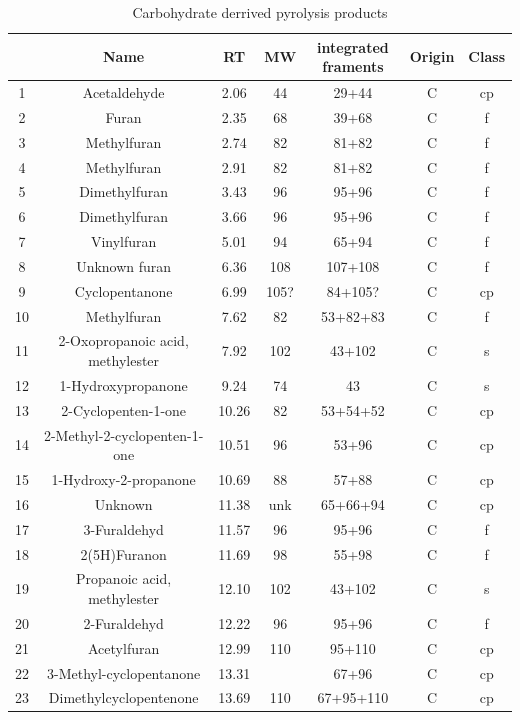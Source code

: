 \documentclass[preprint,review,12pt]{elsarticle}
\begin{document}
\begin{table}[h!]
\begin{center}
\caption{Carbohydrate derrived pyrolysis products}
\label{tab:chprod}
{\tiny
\begin{tabular}{ccccccc}
  \hline
 & Name & RT & MW & integrated framents & Origin & Class \\ 
  \hline
1 & Acetaldehyde & 2.06 & 44 & 29+44 & C & cp \\ 
  2 & Furan & 2.35 & 68 & 39+68 & C & f \\ 
  3 & Methylfuran & 2.74 & 82 & 81+82 & C & f \\ 
  4 & Methylfuran & 2.91 & 82 & 81+82 & C & f \\ 
  5 & Dimethylfuran & 3.43 & 96 & 95+96 & C & f \\ 
  6 & Dimethylfuran & 3.66 & 96 & 95+96 & C & f \\ 
  7 & Vinylfuran & 5.01 & 94 & 65+94 & C & f \\ 
  8 & Unknown furan & 6.36 & 108 & 107+108 & C & f \\ 
  9 & Cyclopentanone & 6.99 & 105? & 84+105? & C & cp \\ 
  10 & Methylfuran & 7.62 & 82 & 53+82+83 & C & f \\ 
  11 & 2-Oxopropanoic acid, methylester & 7.92 & 102 & 43+102 & C & s \\ 
  12 & 1-Hydroxypropanone & 9.24 & 74 & 43 & C & s \\ 
  13 & 2-Cyclopenten-1-one & 10.26 & 82 & 53+54+52 & C & cp \\ 
  14 & 2-Methyl-2-cyclopenten-1-one & 10.51 & 96 & 53+96 & C & cp \\ 
  15 & 1-Hydroxy-2-propanone & 10.69 & 88 & 57+88 & C & cp \\ 
  16 & Unknown & 11.38 & unk & 65+66+94 & C & cp \\ 
  17 & 3-Furaldehyd & 11.57 & 96 & 95+96 & C & f \\ 
  18 & 2(5H)Furanon & 11.69 & 98 & 55+98 & C & f \\ 
  19 & Propanoic acid, methylester & 12.10 & 102 & 43+102 & C & s \\ 
  20 & 2-Furaldehyd & 12.22 & 96 & 95+96 & C & f \\ 
  21 & Acetylfuran & 12.99 & 110 & 95+110 & C & cp \\ 
  22 & 3-Methyl-cyclopentanone & 13.31 &  & 67+96 & C & cp \\ 
  23 & Dimethylcyclopentenone & 13.69 & 110 & 67+95+110 & C & cp \\ 

\end{tabular}}
\end{center}
\end{table}
\end{document}
